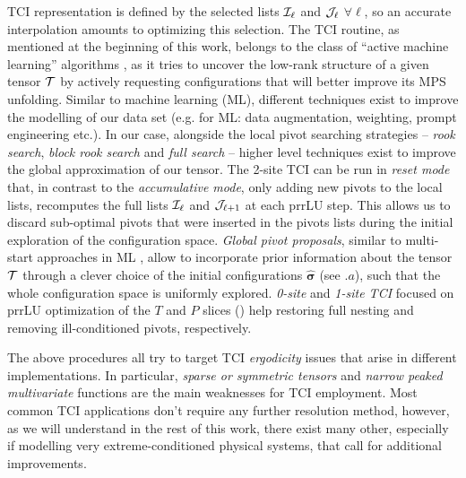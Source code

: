 TCI representation is defined by the selected lists $\mathcal{I}_\ell$ and $\mathcal{J}_\ell$ $\forall \ell$, so an accurate interpolation amounts to optimizing this selection. The TCI routine, as mentioned at the beginning of this work, belongs to the class of ``active machine learning'' algorithms \cite{Settles2012}, as it tries to uncover the low-rank structure of a given tensor $\mathcal{T}$ by actively requesting configurations that will better improve its MPS unfolding. Similar to machine learning (ML), different techniques exist to improve the modelling of our data set (e.g. for ML: data augmentation, weighting, prompt engineering etc.).
In our case, alongside the local pivot searching strategies -- \textit{rook search}, \textit{block rook search} and \textit{full search} -- higher level techniques exist to improve the global approximation of our tensor. The 2-site TCI can be run in \textit{reset mode} that, in contrast to the \textit{accumulative mode}, only adding new pivots to the local lists, recomputes the full lists $\mathcal{I}_\ell$ and $\mathcal{J}_{\ell+1}$ at each prrLU step. This allows us to discard sub-optimal pivots that were inserted in the pivots lists during the initial exploration of the configuration space. \textit{Global pivot proposals}, similar to multi-start approaches in ML \cite{Loshchilov2017}, allow to incorporate prior information about the tensor $\mathcal{T}$ through a clever choice of the initial configurations $\boldsymbol{\hat  \sigma}$ (see $.a$), such that the whole configuration space is uniformly explored. \textit{0-site} and \textit{1-site TCI} focused on prrLU optimization of the $T$ and $P$ slices () help restoring full nesting and removing ill-conditioned pivots, respectively.

The above procedures all try to target TCI \textit{ergodicity} issues that arise in different implementations. In particular, \textit{sparse or symmetric tensors} and \textit{narrow peaked multivariate} functions are the main weaknesses for TCI employment. Most common TCI applications don't require any further resolution method, however, as we will understand in the rest of this work, there exist many other, especially if modelling very extreme-conditioned physical systems, that call for additional improvements.

